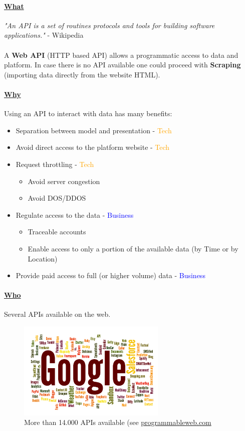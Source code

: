 \documentclass[10pt,a4paper]{article}
\newcommand{\nline}{\\~\\}
\begin{document}
 \paragraph{\uline{What}}
 \textit{"An API is a set of routines protocols and tools for building software applications."} - Wikipedia \nline
 A \textbf{Web API} (HTTP based API) allows a programmatic access to data and platform. In case there is no API available one could proceed with \textbf{Scraping} (importing data directly from the website HTML).
 \paragraph{\uline{Why}} Using an API to interact with data has many benefits:
 \begin{itemize}
 	\item Separation between model and presentation - \textcolor{orange}{Tech}
 	\item Avoid direct access to the platform website - \textcolor{orange}{Tech}
 	\item Request throttling - \textcolor{orange}{Tech}
 	\begin{itemize}
 		\item Avoid server congestion
 		\item Avoid DOS/DDOS
 	\end{itemize}
 	\item Regulate access to the data - \textcolor{blue}{Business}
 	\begin{itemize}
 		\item Traceable accounts
 		\item Enable access to only a portion of the available data (by Time or by Location)
 	\end{itemize}
 	\item Provide paid access to full (or higher volume) data - \textcolor{blue}{Business} 
 \end{itemize}
 \pagebreak
 \paragraph{\uline{Who}}
 Several APIs available on the web.
   \begin{figure}[ht!]
 \hfill \includegraphics[width=200pt]{images/data-acquisition-who}
 \hspace*{\fill}
\caption{More than 14.000 APIs available (see \href{https://www.programmableweb.com/}{programmableweb.com}}
 \end{figure}
\end{document}
